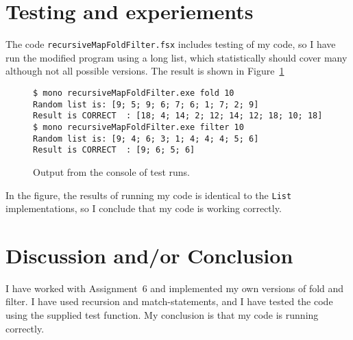 \documentclass[a4paper]{article}
\begin{document}
\section{Testing and experiements}
The code \texttt{recursiveMapFoldFilter.fsx} includes testing of my code, so I have run the modified program using a long list, which statistically should cover many although not all possible versions. The result is shown in Figure~\ref{fig:test}
\begin{figure}
  \lstset{language=bash}
\begin{lstlisting}
$ mono recursiveMapFoldFilter.exe fold 10
Random list is: [9; 5; 9; 6; 7; 6; 1; 7; 2; 9]
Result is CORRECT  : [18; 4; 14; 2; 12; 14; 12; 18; 10; 18]
$ mono recursiveMapFoldFilter.exe filter 10
Random list is: [9; 4; 6; 3; 1; 4; 4; 4; 5; 6]
Result is CORRECT  : [9; 6; 5; 6]
\end{lstlisting}
  \caption{Output from the console of test runs.}
  \label{fig:test}
\end{figure}
In the figure, the results of running my code is identical to the \texttt{List} implementations, so I conclude that my code is working correctly.

\section{Discussion and/or Conclusion}
I have worked with Assignment~6 and implemented my own versions of fold and filter. I have used recursion and match-statements, and I have tested the code using the supplied test function. My conclusion is that my code is running correctly.
\end{document}
